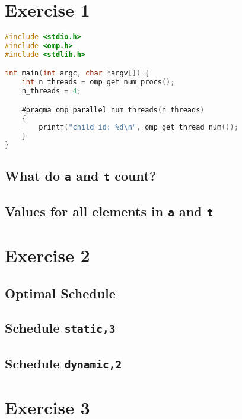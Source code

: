 \documentclass[a4paper,%
11pt,%
DIV12,
headsepline,%
headings=normal,
]{scrartcl}
\begin{document}
\maketitlepage




\section{Exercise 1}

\begin{lstlisting}[language=C]
#include <stdio.h>
#include <omp.h>
#include <stdlib.h>

int main(int argc, char *argv[]) {
    int n_threads = omp_get_num_procs();
    n_threads = 4;

    #pragma omp parallel num_threads(n_threads)
    {
        printf("child id: %d\n", omp_get_thread_num());
    }
}
\end{lstlisting}

\subsection{What do \texttt{a} and \texttt{t} count?}

\subsection{Values for all elements in \texttt{a} and \texttt{t}}

\section{Exercise 2}

\subsection{Optimal Schedule}

\subsection{Schedule \texttt{static,3}}

\subsection{Schedule \texttt{dynamic,2}}

\section{Exercise 3}
\end{document}
